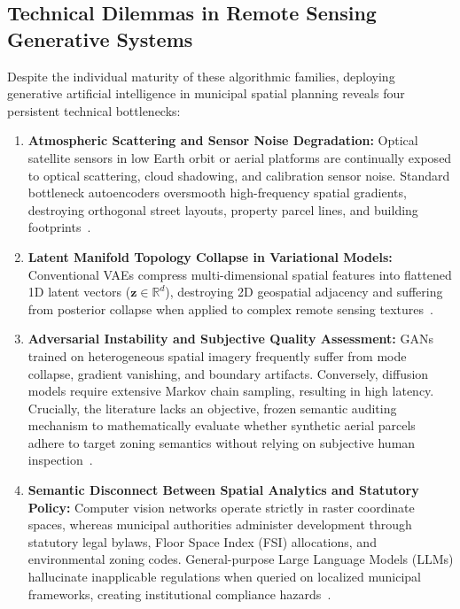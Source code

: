 \documentclass[journal]{IEEEtran}
\begin{document}
\subsection{Technical Dilemmas in Remote Sensing Generative Systems}
Despite the individual maturity of these algorithmic families, deploying generative artificial intelligence in municipal spatial planning reveals four persistent technical bottlenecks:
\begin{enumerate}
    \item \textbf{Atmospheric Scattering and Sensor Noise Degradation:} Optical satellite sensors in low Earth orbit or aerial platforms are continually exposed to optical scattering, cloud shadowing, and calibration sensor noise. Standard bottleneck autoencoders oversmooth high-frequency spatial gradients, destroying orthogonal street layouts, property parcel lines, and building footprints~\cite{zhang2017beyond,ronneberger2015u}.
    \item \textbf{Latent Manifold Topology Collapse in Variational Models:} Conventional VAEs compress multi-dimensional spatial features into flattened 1D latent vectors ($\mathbf{z} \in \mathbb{R}^d$), destroying 2D geospatial adjacency and suffering from posterior collapse when applied to complex remote sensing textures~\cite{kingma2013auto,higgins2017beta}.
    \item \textbf{Adversarial Instability and Subjective Quality Assessment:} GANs trained on heterogeneous spatial imagery frequently suffer from mode collapse, gradient vanishing, and boundary artifacts. Conversely, diffusion models require extensive Markov chain sampling, resulting in high latency. Crucially, the literature lacks an objective, frozen semantic auditing mechanism to mathematically evaluate whether synthetic aerial parcels adhere to target zoning semantics without relying on subjective human inspection~\cite{miyato2018spectral,miyato2018cgans,dhariwal2021diffusion,song2020denoising}.
    \item \textbf{Semantic Disconnect Between Spatial Analytics and Statutory Policy:} Computer vision networks operate strictly in raster coordinate spaces, whereas municipal authorities administer development through statutory legal bylaws, Floor Space Index (FSI) allocations, and environmental zoning codes. General-purpose Large Language Models (LLMs) hallucinate inapplicable regulations when queried on localized municipal frameworks, creating institutional compliance hazards~\cite{schwartz2020green}.
\end{enumerate}
\end{document}
